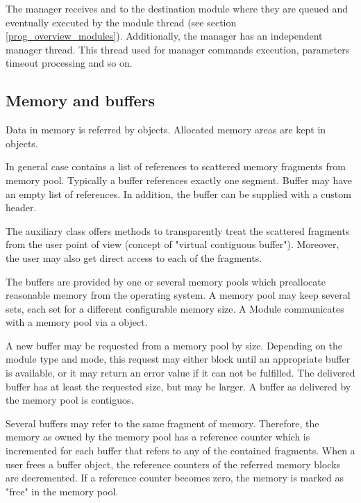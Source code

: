 The manager receives and  
to the destination module where they are queued and eventually executed 
by the module thread (see section \ref{prog_overview_modules}).
Additionally, the manager has an independent manager thread. 
This thread used for manager commands execution, parameters timeout processing and so on. 
 
 
\subsection{Memory and buffers}
Data in memory is referred by   objects. 
Allocated memory areas are kept in\\
objects. 
   

In general case  contains a list of references to scattered memory 
fragments from memory pool. Typically a buffer references exactly one segment.
Buffer may have an empty list of references. In addition, the buffer can be supplied
with a custom header.
 
The auxiliary class   
offers methods to transparently 
treat the scattered fragments from the user point of view 
(concept of "virtual contiguous buffer"). 
Moreover, the user may also get direct access to each of the fragments.      

The buffers are provided by one or several memory pools 
which preallocate reasonable memory from the operating system. 
A memory pool may keep several sets, each set for a different 
configurable memory size. A Module communicates with a memory pool 
via a   object. 

A new buffer may be requested from a memory pool by size. 
Depending on the module type and mode, this request may either block until an 
appropriate buffer is available, or it may return an error value 
if it can not be fulfilled. The delivered buffer has at 
least the requested size, but may be larger. A buffer as 
delivered by the memory pool is contiguos. 

Several buffers may refer to the same fragment of memory. 
Therefore, the memory as owned by the memory pool has a 
reference counter which is incremented for each buffer 
that refers to any of the contained fragments. When a user frees 
a buffer object, the reference counters of the referred 
memory blocks are decremented. If a reference counter becomes 
zero, the memory is marked as "free" in the memory pool.

